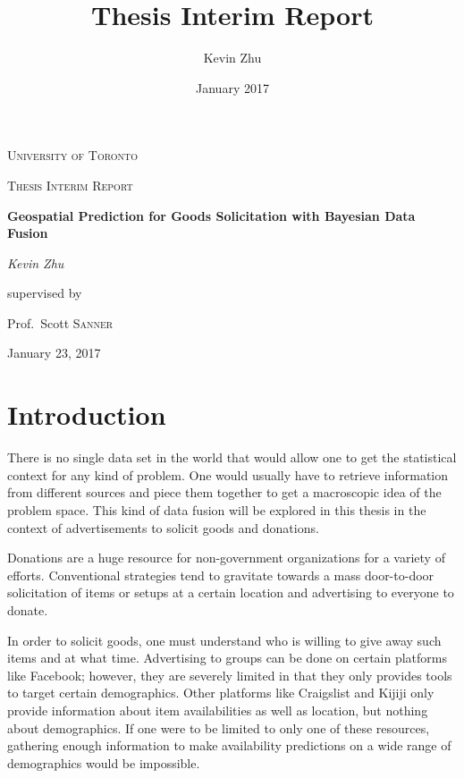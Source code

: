 \documentclass[12pt]{article}
\title{Thesis Interim Report}
\date{January 2017}
\author{Kevin Zhu}
\begin{document}
\begin{titlepage}
   \centering
   {\scshape\LARGE University of Toronto \par}
   \vspace{1cm}
   {\scshape\Large Thesis Interim Report\par}
   \vspace{1.5cm}
   {\huge\bfseries Geospatial Prediction for Goods Solicitation with Bayesian Data Fusion\par}
   \vspace{2cm}
   {\Large\itshape Kevin Zhu\par}
   \vfill
   supervised by\par
   Prof.~Scott \textsc{Sanner}
   \vfill
   {\large January 23, 2017\par}
\end{titlepage}

\newpage
\tableofcontents
\newpage

\section{Introduction}

There is no single data set in the world that would allow one to get the statistical context for any kind of problem. One would usually have to retrieve information from different sources and piece them together to get a macroscopic idea of the problem space. This kind of data fusion will be explored in this thesis in the context of advertisements to solicit goods and donations. 

Donations are a huge resource for non-government organizations for a variety of efforts. %
Conventional strategies tend to gravitate towards a mass door-to-door solicitation of items or setups at a certain location and advertising to everyone to donate. %


In order to solicit goods, one must understand who is willing to give away such items and at what time. Advertising to groups can be done on certain platforms like Facebook; however, they are severely limited in that they only provides tools to target certain demographics. Other platforms like Craigslist and Kijiji only provide information about item availabilities as well as location, but nothing about demographics. If one were to be limited to only one of these resources, gathering enough information to make availability predictions on a wide range of demographics would be impossible.
\end{document}
